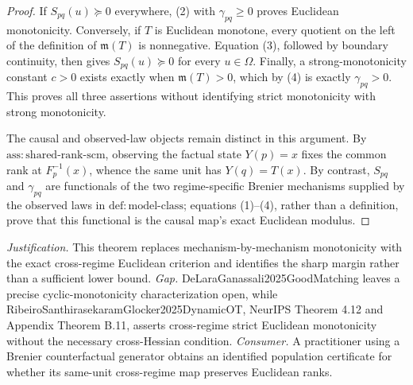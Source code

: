 \documentclass{article}
\begin{document}
\begin{proof}
If \(S_{pq}(u)\succeq0\) everywhere, (2) with \(\gamma_{pq}\ge0\) proves Euclidean monotonicity.  Conversely, if \(T\) is Euclidean monotone, every quotient on the left of the definition of \(\mathfrak m(T)\) is nonnegative.  Equation (3), followed by boundary continuity, then gives \(S_{pq}(u)\succeq0\) for every \(u\in\Omega\).  Finally, a strong-monotonicity constant \(c>0\) exists exactly when \(\mathfrak m(T)>0\), which by (4) is exactly \(\gamma_{pq}>0\).  This proves all three assertions without identifying strict monotonicity with strong monotonicity.

The causal and observed-law objects remain distinct in this argument.  By \(\mathrm{ass:shared\text{-}rank\text{-}scm}\), observing the factual state \(Y(p)=x\) fixes the common rank at \(F_p^{-1}(x)\), whence the same unit has \(Y(q)=T(x)\).  By contrast, \(S_{pq}\) and \(\gamma_{pq}\) are functionals of the two regime-specific Brenier mechanisms supplied by the observed laws in \(\mathrm{def:model\text{-}class}\); equations (1)--(4), rather than a definition, prove that this functional is the causal map's exact Euclidean modulus.
\end{proof}
\par\smallskip\noindent \textit{Justification.} This theorem replaces mechanism-by-mechanism monotonicity with the exact cross-regime Euclidean criterion and identifies the sharp margin rather than a sufficient lower bound. \textit{Gap.} DeLaraGanassali2025GoodMatching leaves a precise cyclic-monotonicity characterization open, while RibeiroSanthirasekaramGlocker2025DynamicOT, NeurIPS Theorem 4.12 and Appendix Theorem B.11, asserts cross-regime strict Euclidean monotonicity without the necessary cross-Hessian condition. \textit{Consumer.} A practitioner using a Brenier counterfactual generator obtains an identified population certificate for whether its same-unit cross-regime map preserves Euclidean ranks.
\end{document}
